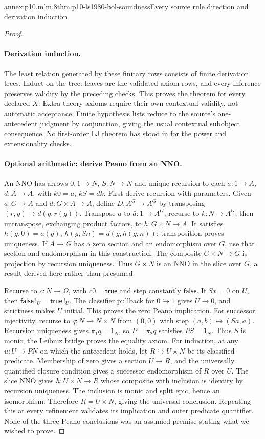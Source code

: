 \begin{annexitem}{annex:p10.mlm.8}{thm:p10-ls1980-hol-soundness}{Every source rule direction and derivation induction}
\begin{proof}
\paragraph{Derivation induction.}
The least relation generated by these finitary rows consists of finite
derivation trees. Induct on the tree: leaves are the validated axiom rows,
and every inference preserves validity by the preceding checks. This proves
the theorem for every declared \(X\). Extra theory axioms require their
own contextual validity, not automatic acceptance. Finite hypothesis lists
reduce to the source's one-antecedent judgment by conjunction, giving the
usual contextual subobject consequence. No first-order LJ theorem has stood
in for the power and extensionality checks.

\paragraph{Optional arithmetic: derive Peano from an NNO.}
An NNO has arrows \(0:1\to N\), \(S:N\to N\) and unique recursion to each
\(a:1\to A\), \(d:A\to A\), with \(k0=a\), \(kS=dk\).
First derive recursion with parameters. Given \(a:G\to A\) and
\(d:G\times A\to A\), define \(D:A^G\to A^G\) by transposing
\((r,g)\mapsto d(g,r(g))\). Transpose \(a\) to \(\bar a:1\to A^G\),
recurse to \(k:N\to A^G\), then untranspose, exchanging product factors,
to \(h:G\times N\to A\). It satisfies
\(h(g,0)=a(g)\), \(h(g,Sn)=d(g,h(g,n))\); transposition proves uniqueness.
If \(A\to G\) has a zero section and an endomorphism over \(G\), use that
section and endomorphism in this construction. The composite \(G\times N\to G\)
is projection by recursion uniqueness. Thus \(G\times N\) is an NNO in
the slice over \(G\), a result derived here rather than presumed.

Recurse to \(c:N\to\Omega\), with \(c0=\mathsf{true}\) and step constantly
\(\mathsf{false}\). If \(Sx=0\) on \(U\), then
\(\mathsf{false}\,!_U=\mathsf{true}\,!_U\). The classifier pullback for
\(0\hookrightarrow1\) gives \(U\to0\), and strictness makes \(U\) initial.
This proves the zero Peano implication.
For successor injectivity, recurse to \(q:N\to N\times N\) from \((0,0)\)
with step \((a,b)\mapsto(Sa,a)\). Recursion uniqueness gives
\(\pi_1q=1_N\), so \(P=\pi_2q\) satisfies \(PS=1_N\). Thus \(S\) is monic;
the Leibniz bridge proves the equality axiom.
For induction, at any \(u:U\to PN\) on which the antecedent holds, let
\(R\hookrightarrow U\times N\) be its classified predicate. Membership of
zero gives a section \(U\to R\), and the universally quantified closure
condition gives a successor endomorphism of \(R\) over \(U\). The slice NNO
gives \(h:U\times N\to R\) whose composite with inclusion is identity by
recursion uniqueness. The inclusion is monic and split epic, hence an
isomorphism. Therefore \(R=U\times N\), giving the universal conclusion.
Repeating this at every refinement validates its implication and outer
predicate quantifier. None of the three Peano conclusions was an assumed
premise stating what we wished to prove.


\end{proof}
\end{annexitem}
